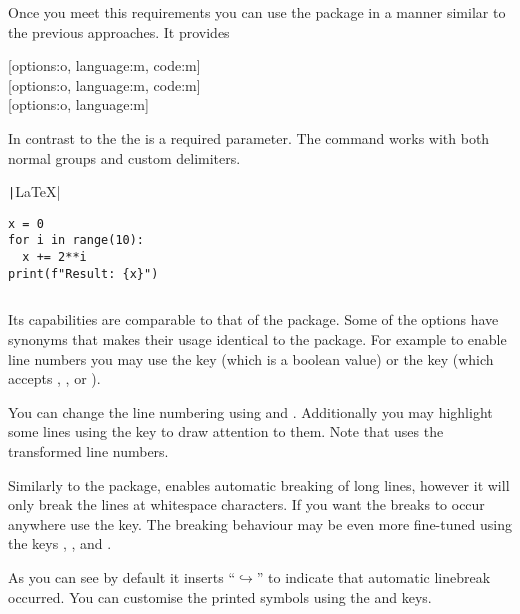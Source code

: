 Once you meet this requirements you can use the package in a manner similar to
the previous approaches. It provides
\begin{lscommand}
  [options:o, language:m, code:m] \\
  [options:o, language:m, code:m] \\
  [options:o, language:m]
\end{lscommand}
In contrast to the  the  is a required parameter.
The command  works with both normal groups and custom
delimiters.
\begin{example}[examplewidth=0.56\linewidth]
\texttt|\LaTeX{}|

\begin{verbatim}
x = 0
for i in range(10):
  x += 2**i
print(f"Result: {x}")
\end{verbatim}

\inputminted{rust}{age.rs}
\end{example}

Its capabilities are comparable to that of the  package. Some of
the options have synonyms that makes their usage identical to the
 package. For example to enable line numbers you may use the
 key (which is a boolean value) or the  key
(which accepts , ,  or ).
You can change the line numbering using  and
. Additionally you may highlight some lines using the
 key to draw attention to them. Note that
 uses the transformed line numbers.
\begin{chktexignore}
\end{chktexignore}

Similarly to the  package,  enables automatic
breaking of long lines, however it will only break the lines at whitespace
characters. If you want the breaks to occur anywhere use the
 key. The breaking behaviour may be even more
fine-tuned using the keys , ,
 and .
As you can see by default it inserts \enquote{\(\hookrightarrow\)} to indicate
that automatic linebreak occurred. You can customise the printed symbols using
the  and  keys.

